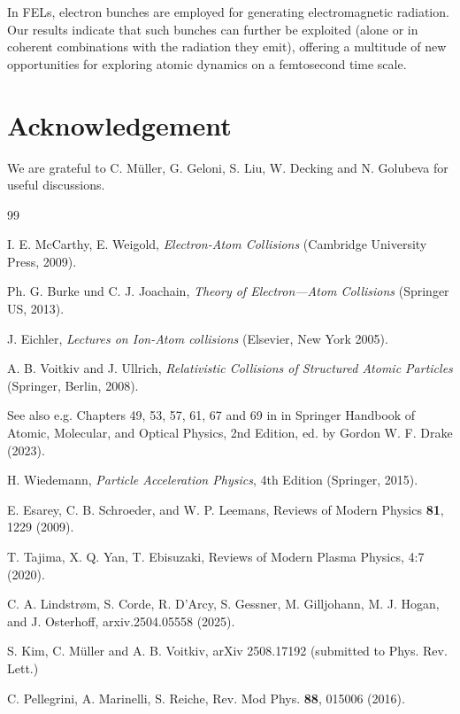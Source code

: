 \documentclass[prl, twocolumn, floatfix]{revtex4}
\begin{document}
In FELs, electron bunches are employed for generating
electromagnetic radiation.
Our results indicate that such bunches can further be exploited
(alone or in coherent combinations with the radiation they emit),
offering  a multitude of new opportunities for exploring
atomic dynamics on a femtosecond time scale.


\section*{Acknowledgement}

We are grateful to C. M\"uller, G. Geloni, S. Liu,
W. Decking and N. Golubeva for useful discussions.

\begin{thebibliography}{99}

  I. E. McCarthy, E. Weigold,
{\it Electron-Atom Collisions}
(Cambridge University Press, 2009).

 Ph. G. Burke und C. J. Joachain,
{\it Theory of Electron—Atom Collisions}
(Springer US, 2013).

J. Eichler, {\it Lectures on Ion-Atom collisions}
(Elsevier, New York 2005).

 A. B. Voitkiv and J. Ullrich,
{\it Relativistic Collisions of Structured Atomic Particles}
(Springer, Berlin, 2008).

See also e.g. Chapters 49, 53, 57, 61, 67 and 69 in in { Springer Handbook of
Atomic, Molecular, and Optical Physics}, 2nd Edition,
ed. by Gordon W. F. Drake (2023).

 H. Wiedemann,
{\it Particle Acceleration Physics}, 4th Edition
(Springer, 2015).


E. Esarey, C. B. Schroeder, and W. P. Leemans,
Reviews of Modern Physics
{\bf 81}, 1229 (2009).

 T. Tajima, X. Q. Yan, T. Ebisuzaki,
Reviews of Modern Plasma Physics, 4:7 (2020).


 C. A. Lindstrøm, S. Corde, R. D'Arcy, S. Gessner, M. Gilljohann, M. J. Hogan, and J. Osterhoff, arxiv.2504.05558 (2025).



 S. Kim, C. M\"uller and A. B. Voitkiv,
arXiv 2508.17192 (submitted to Phys. Rev. Lett.)

C. Pellegrini, A. Marinelli, S. Reiche,
Rev. Mod Phys. {\bf 88}, 015006 (2016).


\end{thebibliography}
\end{document}
